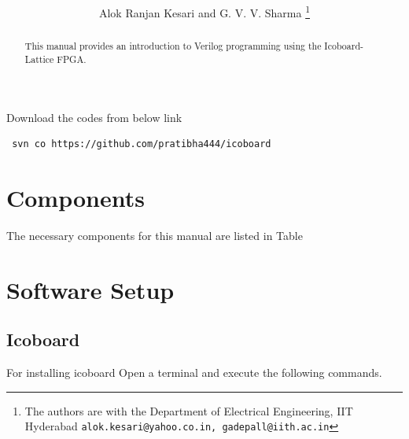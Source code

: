 \documentclass[journal,12pt,twocolumn]{IEEEtran}
\begin{document}
     \def\rightbox#1{\makebox[0in][r]{#1}}
     \def\centbox#1{\makebox[0in]{#1}}
     \def\topbox#1{\raisebox{-\baselineskip}[0in][0in]{#1}}
     \def\midbox#1{\raisebox{-0.5\baselineskip}[0in][0in]{#1}}
\vspace{3cm}
\title{
}%
\author{Alok Ranjan Kesari and G. V. V. Sharma%
\thanks{ The authors are with the Department of Electrical Engineering, IIT Hyderabad
        {\tt\small alok.kesari@yahoo.co.in, gadepall@iith.ac.in}}%
}
\tableofcontents
 
\begin{abstract}
This manual provides an introduction to Verilog programming using the Icoboard-Lattice FPGA.
\end{abstract}
Download the codes from below link
\begin{lstlisting}
 svn co https://github.com/pratibha444/icoboard
\end{lstlisting}
\section{Components}
The necessary components for this manual are listed in Table 
\begin{table}[!h]
\centering

\caption{}
\label{table:components}
\end{table}
\section{Software Setup}
\subsection{Icoboard}
For installing icoboard
Open a terminal and execute the following commands.
\end{document}
